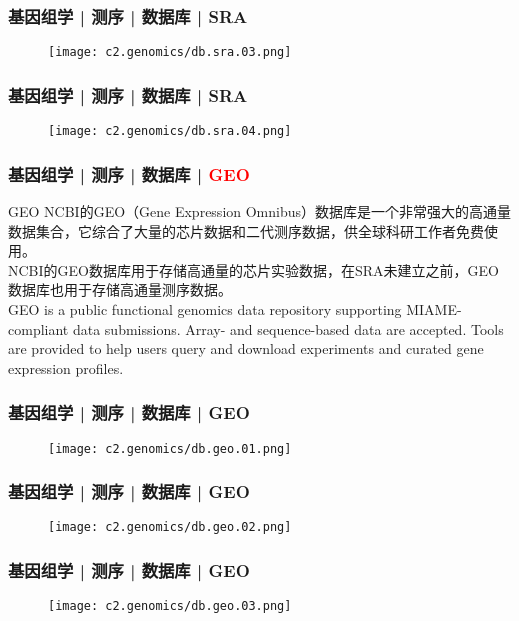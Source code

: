 \begin{frame}
  \frametitle{基因组学 | 测序 | 数据库 | SRA}
  \begin{figure}
    \centering
    \texttt{[image: c2.genomics/db.sra.03.png]}
  \end{figure}
\end{frame}
    
\begin{frame}
  \frametitle{基因组学 | 测序 | 数据库 | SRA}
  \begin{figure}
    \centering
    \texttt{[image: c2.genomics/db.sra.04.png]}
  \end{figure}
\end{frame}
    
\begin{frame}
  \frametitle{基因组学 | 测序 | 数据库 | \textcolor{red}{GEO}}
  \begin{block}{GEO}
NCBI的GEO（Gene Expression Omnibus）数据库是一个非常强大的高通量数据集合，它综合了大量的芯片数据和二代测序数据，供全球科研工作者免费使用。\\
\vspace{1em}
NCBI的GEO数据库用于存储高通量的芯片实验数据，在SRA未建立之前，GEO数据库也用于存储高通量测序数据。\\
\vspace{1em}
GEO is a public functional genomics data repository supporting MIAME-compliant data submissions. Array- and sequence-based data are accepted. Tools are provided to help users query and download experiments and curated gene expression profiles.
  \end{block}
\end{frame}
    
\begin{frame}
  \frametitle{基因组学 | 测序 | 数据库 | GEO}
  \begin{figure}
    \centering
    \texttt{[image: c2.genomics/db.geo.01.png]}
  \end{figure}
\end{frame}
    
\begin{frame}
  \frametitle{基因组学 | 测序 | 数据库 | GEO}
  \begin{figure}
    \centering
    \texttt{[image: c2.genomics/db.geo.02.png]}
  \end{figure}
\end{frame}

\begin{frame}
  \frametitle{基因组学 | 测序 | 数据库 | GEO}
  \begin{figure}
    \centering
    \texttt{[image: c2.genomics/db.geo.03.png]}
  \end{figure}
\end{frame}
    

